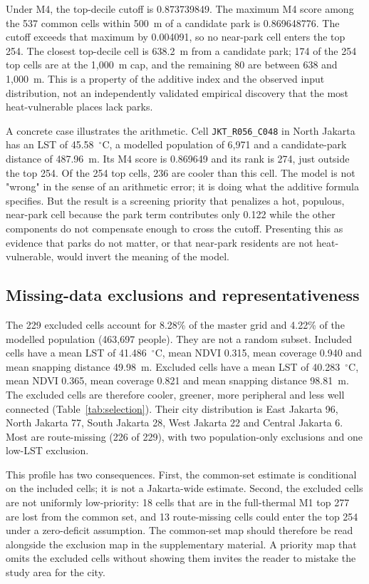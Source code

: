 \documentclass[times,twoside]{_Templates/MultiTargetManuscript}
\begin{document}
Under M4, the top-decile cutoff is 0.873739849. The maximum M4
score among the 537 common cells within 500~m of a candidate park is 0.869648776.
The cutoff exceeds that maximum by 0.004091, so no near-park cell enters the top
254. The closest top-decile cell is 638.2~m from a candidate park; 174 of the 254
top cells are at the 1,000~m cap, and the remaining 80 are between 638 and
1,000~m. This is a property of the additive index and the observed input
distribution, not an independently validated empirical discovery that the most
heat-vulnerable places lack parks.

A concrete case illustrates the arithmetic. Cell \texttt{JKT\_R056\_C048} in
North Jakarta has an LST of 45.58~$^\circ$C, a modelled population of 6,971 and a
candidate-park distance of 487.96~m. Its M4 score is 0.869649 and its rank is 274,
just outside the top 254. Of the 254 top cells, 236 are cooler than this cell.
The model is not "wrong" in the sense of an arithmetic error; it is doing what
the additive formula specifies. But the result is a screening priority that
penalizes a hot, populous, near-park cell because the park term contributes only
0.122 while the other components do not compensate enough to cross the cutoff.
Presenting this as evidence that parks do not matter, or that near-park
residents are not heat-vulnerable, would invert the meaning of the model.

\subsection{Missing-data exclusions and representativeness}

The 229 excluded cells account for 8.28\% of the master grid and 4.22\% of the
modelled population (463,697 people). They are not a random subset. Included
cells have a mean LST of 41.486~$^\circ$C, mean NDVI 0.315, mean coverage 0.940
and mean snapping distance 49.98~m. Excluded cells have a mean LST of
40.283~$^\circ$C, mean NDVI 0.365, mean coverage 0.821 and mean snapping distance
98.81~m. The excluded cells are therefore cooler, greener, more peripheral and
less well connected (Table~\ref{tab:selection}). Their city distribution is East Jakarta 96, North Jakarta
77, South Jakarta 28, West Jakarta 22 and Central Jakarta 6. Most are
route-missing (226 of 229), with two population-only exclusions and one low-LST
exclusion.

This profile has two consequences. First, the common-set estimate is conditional
on the included cells; it is not a Jakarta-wide estimate. Second, the excluded
cells are not uniformly low-priority: 18 cells that are in the full-thermal M1
top 277 are lost from the common set, and 13 route-missing cells could enter the
top 254 under a zero-deficit assumption. The common-set map should therefore be
read alongside the exclusion map in the supplementary material. A priority map
that omits the excluded cells without showing them invites the reader to mistake
the study area for the city.
\end{document}
